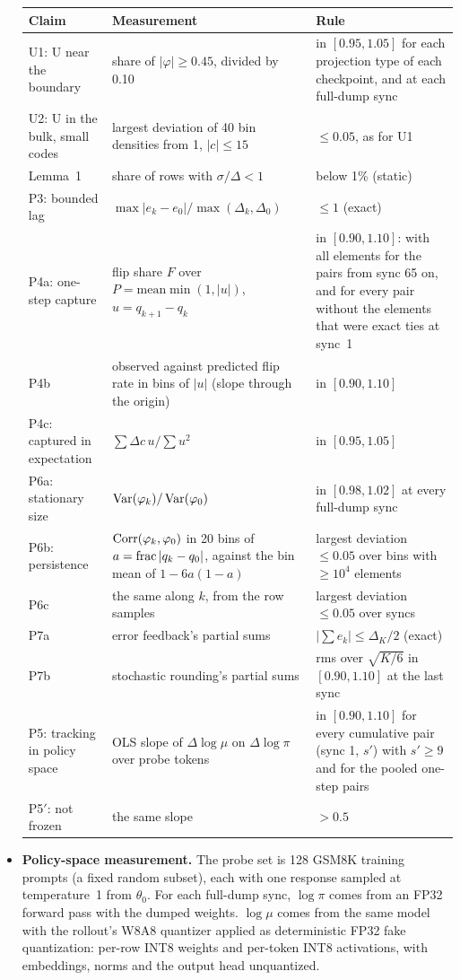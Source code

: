 \documentclass[11pt]{article}
\begin{document}
\begin{itemize}
\smallskip
{\footnotesize
\begin{tabularx}{\linewidth}{@{}l L L@{}}
\toprule
Claim & Measurement & Rule\\
\midrule
U1: U near the boundary & share of $|\varphi|\ge0.45$, divided by 0.10 & in $[0.95,1.05]$ for each projection type of each checkpoint, and at each full-dump sync\\
U2: U in the bulk, small codes & largest deviation of 40 bin densities from 1, $|c|\le15$ & $\le0.05$, as for U1\\
Lemma~1 & share of rows with $\sigma/\Delta<1$ & below 1\% (static)\\
P3: bounded lag & $\max|e_k-e_0|/\max(\Delta_k,\Delta_0)$ & $\le1$ (exact)\\
P4a: one-step capture & flip share $F$ over $P=\mathrm{mean}\min(1,|u|)$, $u=q_{k+1}-q_k$ & in $[0.90,1.10]$: with all elements for the pairs from sync 65 on, and for every pair without the elements that were exact ties at sync~1\\
P4b & observed against predicted flip rate in bins of $|u|$ (slope through the origin) & in $[0.90,1.10]$\\
P4c: captured in expectation & $\sum\Delta c\,u/\sum u^2$ & in $[0.95,1.05]$\\
P6a: stationary size & $\Var(\varphi_k)/\Var(\varphi_0)$ & in $[0.98,1.02]$ at every full-dump sync\\
P6b: persistence & $\Corr(\varphi_k,\varphi_0)$ in 20 bins of $a=\fracpart|q_k-q_0|$, against the bin mean of $1-6a(1-a)$ & largest deviation $\le0.05$ over bins with $\ge10^4$ elements\\
P6c & the same along $k$, from the row samples & largest deviation $\le0.05$ over syncs\\
P7a & error feedback's partial sums & $|\sum e_k|\le\Delta_K/2$ (exact)\\
P7b & stochastic rounding's partial sums & rms over $\sqrt{K/6}$ in $[0.90,1.10]$ at the last sync\\
P5: tracking in policy space & OLS slope of $\Delta\log\mu$ on $\Delta\log\pi$ over probe tokens & in $[0.90,1.10]$ for every cumulative pair (sync 1, $s'$) with $s'\ge9$ and for the pooled one-step pairs\\
P5$'$: not frozen & the same slope & $>0.5$\\
\bottomrule
\end{tabularx}\par}
\item \textbf{Policy-space measurement.} The probe set is 128 GSM8K training prompts (a fixed random subset), each with one response sampled at temperature~1 from $\theta_0$. For each full-dump sync, $\log\pi$ comes from an FP32 forward pass with the dumped weights. $\log\mu$ comes from the same model with the rollout's W8A8 quantizer applied as deterministic FP32 fake quantization: per-row INT8 weights and per-token INT8 activations, with embeddings, norms and the output head unquantized.

\end{itemize}
\end{document}
